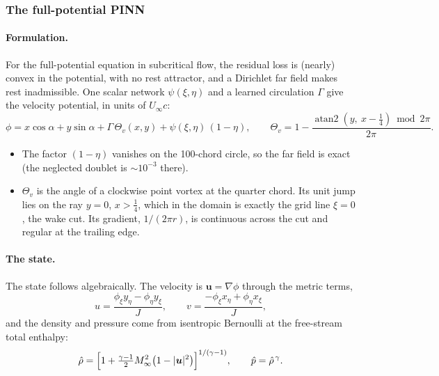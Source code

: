 \documentclass[11pt]{article}
\newcommand{\Ma}{M_\infty}
\newcommand{\vu}{\bm{u}}
\begin{document}
\subsubsection{The full-potential PINN}
\label{sec:potential}

\paragraph{Formulation.}
For the full-potential equation in subcritical flow, the residual loss is (nearly) convex in the
potential, with no rest attractor, and a Dirichlet far field makes rest inadmissible. One scalar
network $\psi(\xi,\eta)$ and a learned circulation $\Gamma$ give the velocity potential, in units
of $U_\infty c$:
\begin{equation}
  \phi = x\cos\alpha + y\sin\alpha + \Gamma\,\Theta_v(x,y) + \psi(\xi,\eta)\,(1-\eta),\qquad
  \Theta_v = 1 - \frac{\operatorname{atan2}(y,\ x - \tfrac14)\bmod 2\pi}{2\pi}.
  \label{eq:phi}
\end{equation}
\begin{itemize}
  \item The factor $(1-\eta)$ vanishes on the 100-chord circle, so the far field is exact (the
    neglected doublet is $\sim10^{-3}$ there).
  \item $\Theta_v$ is the angle of a clockwise point vortex at the quarter chord. Its unit jump lies
    on the ray $y = 0$, $x > \tfrac14$, which in the domain is exactly the grid line $\xi = 0$, the
    wake cut. Its gradient, $1/(2\pi r)$, is continuous across the cut and regular at the trailing
    edge.
\end{itemize}

\paragraph{The state.}
The state follows algebraically. The velocity is $\vu = \nabla\phi$ through the metric terms,
\begin{equation}
  u = \frac{\phi_\xi y_\eta - \phi_\eta y_\xi}{J},\qquad v = \frac{-\phi_\xi x_\eta + \phi_\eta x_\xi}{J},
\end{equation}
and the density and pressure come from isentropic Bernoulli at the free-stream total enthalpy:
\begin{equation}
  \hat\rho = \Bigl[1 + \tfrac{\gamma-1}{2}\Ma^2\bigl(1 - |\vu|^2\bigr)\Bigr]^{1/(\gamma-1)},
  \qquad \hat p = \hat\rho^{\,\gamma}.
  \label{eq:bernoulli}
\end{equation}
\end{document}
